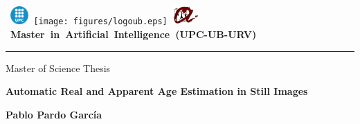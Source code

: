 \thispagestyle{empty}
\vspace*{-2cm}

\hbox{
\includegraphics[width=0.7cm]{figures/logoupc.eps}
\texttt{[image: figures/logoub.eps]}
\includegraphics[width=1cm]{figures/logourv.eps}
\Large \bf Master in Artificial Intelligence (UPC-UB-URV)}
\hrule

\bigskip\bigskip\bigskip

\begin{center}

{\LARGE Master of Science Thesis}

\bigskip\bigskip\bigskip\bigskip\bigskip

\textbf{\huge \bf Automatic Real and Apparent Age Estimation in Still Images}

\bigskip\bigskip\bigskip\bigskip\bigskip

{\LARGE \bf Pablo Pardo García}

\end{center}
\vspace*{3cm}

